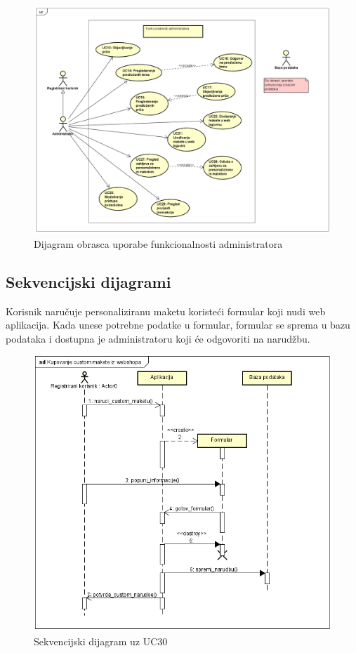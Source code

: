					\begin{figure}
						\centering
						\includegraphics[scale=0.34]{"slike/Funkcionalnost administratora"}
						\caption{Dijagram obrasca uporabe funkcionalnosti administratora}
						\label{fig:funkcionalnost-administratora}
					\end{figure}
					
					
				\eject		
				
			\subsection{Sekvencijski dijagrami}
				
				Korisnik naručuje personaliziranu maketu koristeći formular koji nudi web aplikacija. Kada unese potrebne podatke u formular, formular se sprema u bazu podataka i dostupna je administratoru koji će odgovoriti na narudžbu.
				
				\begin{figure} [!h]
					\centering
					\includegraphics[scale=0.65]{"slike/seqdiag_01"}
					\caption{Sekvencijski dijagram uz UC30}
					\label{fig:seqdiag_01}
				\end{figure}
				\pagebreak
				
